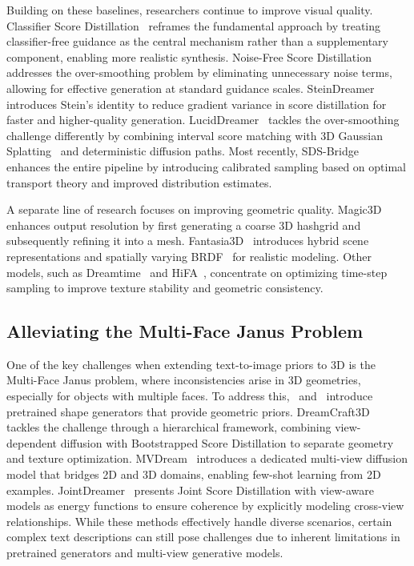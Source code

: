 Building on these baselines, researchers continue to improve visual quality. Classifier Score Distillation~\citep{yu2023text} reframes the fundamental approach by treating classifier-free guidance as the central mechanism rather than a supplementary component, enabling more realistic synthesis. Noise-Free Score Distillation~\citep{katzir2023noise} addresses the over-smoothing problem by eliminating unnecessary noise terms, allowing for effective generation at standard guidance scales. SteinDreamer~\citep{wang2023steindreamer} introduces Stein's identity to reduce gradient variance in score distillation for faster and higher-quality generation. LucidDreamer~\citep{liang2024luciddreamer} tackles the over-smoothing challenge differently by combining interval score matching with 3D Gaussian Splatting~\citep{kerbl20233d} and deterministic diffusion paths. Most recently, SDS-Bridge~\citep{mcallister2024rethinking} enhances the entire pipeline by introducing calibrated sampling based on optimal transport theory and improved distribution estimates.

A separate line of research focuses on improving geometric quality. Magic3D~\citep{lin2023magic3d} enhances output resolution by first generating a coarse 3D hashgrid and subsequently refining it into a mesh. Fantasia3D~\citep{chen2023fantasia3d} introduces hybrid scene representations and spatially varying BRDF~\citep{united1977geometrical} for realistic modeling. Other models, such as Dreamtime~\citep{huang2023dreamtime} and HiFA~\citep{zhu2023hifa}, concentrate on optimizing time-step sampling to improve texture stability and geometric consistency.


\subsection{Alleviating the Multi-Face Janus Problem}
One of the key challenges when extending text-to-image priors to 3D is the Multi-Face Janus problem, where inconsistencies arise in 3D geometries, especially for objects with multiple faces. To address this,~\citet{yi2023gaussiandreamer} and~\citet{ma2023geodream} introduce pretrained shape generators that provide geometric priors. DreamCraft3D~\citep{sun2023dreamcraft3d} tackles the challenge through a hierarchical framework, combining view-dependent diffusion with Bootstrapped Score Distillation to separate geometry and texture optimization. MVDream~\citep{shi2023mvdream} introduces a dedicated multi-view diffusion model that bridges 2D and 3D domains, enabling few-shot learning from 2D examples. JointDreamer~\citep{jiang2025jointdreamer} presents Joint Score Distillation with view-aware models as energy functions to ensure coherence by explicitly modeling cross-view relationships. While these methods effectively handle diverse scenarios, certain complex text descriptions can still pose challenges due to inherent limitations in pretrained generators and multi-view generative models.

